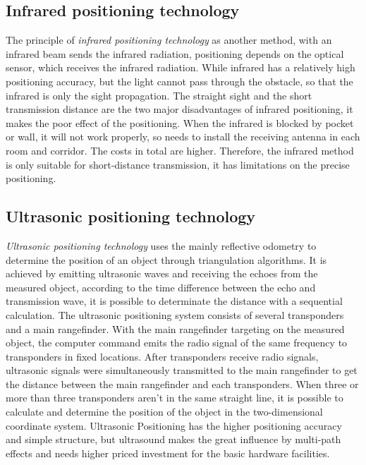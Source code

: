 \subsection{Infrared positioning technology}

The principle of \textit{infrared positioning technology} as another method, with an infrared beam sends the infrared radiation, positioning depends on the optical sensor, which receives the infrared radiation. While infrared has a relatively high positioning accuracy, but the light cannot pass through the obstacle, so that the infrared is only the sight propagation. The straight sight and the short transmission distance are the two major disadvantages of infrared positioning, it makes the poor effect of the positioning. When the infrared is blocked by pocket or wall, it will not work properly, so needs to install the receiving antenna in each room and corridor. The costs in total are higher. Therefore, the infrared method is only suitable for short-distance transmission, it has limitations on the precise positioning.  

\subsection{Ultrasonic positioning technology}

\textit{Ultrasonic positioning technology} uses the mainly reflective odometry to determine the position of an object through triangulation algorithms. It is achieved by emitting ultrasonic waves and receiving the echoes from the measured object, according to the time difference between the echo and transmission wave, it is possible to determinate the distance with a sequential calculation. The ultrasonic positioning system consists of several transponders and a main rangefinder. With the main rangefinder targeting on the measured object, the computer command emits the radio signal of the same frequency to transponders in fixed locations. After transponders receive radio signals, ultrasonic signals were simultaneously transmitted to the main rangefinder to get the distance between the main rangefinder and each transponders. When three or more than three transponders aren’t in the same straight line, it is possible to calculate and determine the position of the object in the two-dimensional coordinate system. Ultrasonic Positioning has the higher positioning accuracy and simple structure, but ultrasound makes the great influence by multi-path effects and needs higher priced investment for the basic hardware facilities.    

